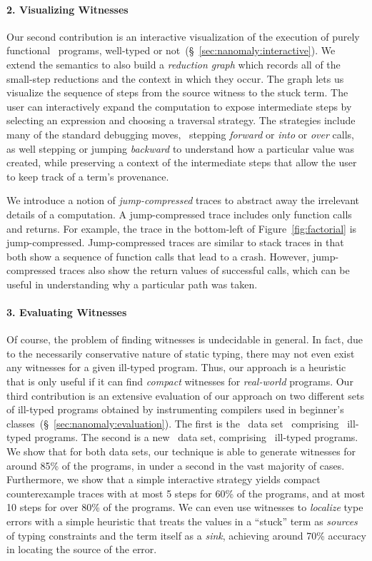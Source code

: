 \paragraph{2. Visualizing Witnesses}
Our second contribution is an interactive visualization of the
execution of purely functional \ocaml\ programs, well-typed or not~(\S~\ref{sec:nanomaly:interactive}).
%
We extend the semantics to also build a \emph{reduction graph}
which records all of the small-step reductions and the context
in which they occur.
%
The graph lets us visualize the sequence of
steps from the source witness to the stuck term. The user can
interactively expand the computation to expose intermediate steps
by selecting an expression and choosing a traversal strategy.
%
The strategies include many of the standard debugging moves, \eg\
stepping \emph{forward} or \emph{into} or \emph{over} calls, as well
stepping or jumping \emph{backward} to understand how a particular
value was created, while preserving a context of the intermediate
steps that allow the user to keep track of a term's provenance.

We introduce a notion of \emph{jump-compressed} traces to abstract away
the irrelevant details of a computation.
%
A jump-compressed trace includes only function
calls and returns. For example, the trace in the bottom-left of
Figure~\ref{fig:factorial} is jump-compressed.
%
Jump-compressed traces are similar to stack traces in that both show a
sequence of function calls that lead to a crash. However, jump-compressed
traces also show the return values of successful calls, which can be
useful in understanding why a particular path was taken.

\paragraph{3. Evaluating Witnesses}
%
Of course, the problem of finding witnesses is
undecidable in general. In fact, due to the necessarily
conservative nature of static typing, there
may not even exist any witnesses for a given
ill-typed program.
%
Thus, our approach is a heuristic that is only useful
if it can find \emph{compact} witnesses for
\emph{real-world} programs.
%
Our third contribution is an extensive evaluation of our approach
on two different sets of ill-typed programs obtained by instrumenting
compilers used in beginner's classes~(\S~\ref{sec:nanomaly:evaluation}).
%
The first is the \uwbench\ data set~\cite{Lerner2007-dt}
comprising \uwsize\ ill-typed programs.
%
The second is a new \ucsdbench\ data set, comprising \ucsdsize\
ill-typed programs.
%
We show that for both data sets, our technique is able to generate
witnesses for around 85\% of the programs, in under a second in the
vast majority of cases.
%
Furthermore, we show that a simple interactive strategy yields
compact counterexample traces with at most 5 steps for 60\%
of the programs, and at most 10 steps for over 80\% of the programs.
%
We can even use witnesses to \emph{localize} type errors with a simple
heuristic that treats the values in a ``stuck'' term as \emph{sources}
of typing constraints and the term itself as a \emph{sink},
achieving around 70\% accuracy in locating the source of the error.

